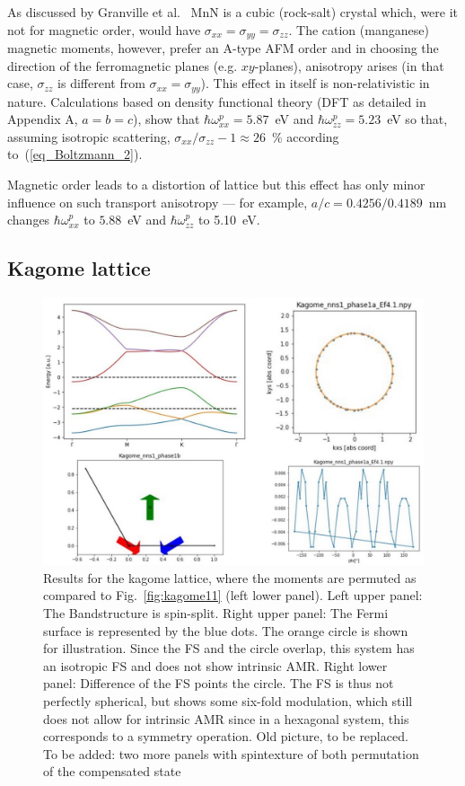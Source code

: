 \documentclass[prb,showpacs,amsmath,amssymb,superscriptaddress,twocolumn,floatfix]{revtex4-1}
\begin{document}
As discussed by Granville et al.~\cite{g} %
MnN is a cubic
(rock-salt) crystal which, were it not for magnetic order, would have
$\sigma_{xx}=\sigma_{yy}=\sigma_{zz}$. The cation (manganese)
magnetic moments, however, prefer an A-type AFM order and in choosing
the direction of the ferromagnetic planes (e.g. $xy$-planes),
anisotropy arises (in that case, $\sigma_{zz}$ is different from
$\sigma_{xx}=\sigma_{yy}$). This effect in itself is non-relativistic in nature.
Calculations based on density functional theory (DFT as 
detailed in Appendix A, $a=b=c$), show that
$\hbar\omega^p_{xx}=5.87$~eV and $\hbar\omega^p_{zz}=5.23$~eV so that,
assuming isotropic scattering, $\sigma_{xx}/\sigma_{zz}-1\approx 26$~\%
according to~(\ref{eq_Boltzmann_2}).

Magnetic order leads to a distortion of lattice but this effect has only
minor influence on such transport anisotropy --- for example,
$a/c=0.4256/0.4189$~nm changes $\hbar\omega^p_{xx}$ to $5.88$~eV and
$\hbar\omega^p_{zz}$ to 5.10~eV.


\subsection{Kagome lattice}

\begin{figure}
	\centering
	\includegraphics[width=0.7\linewidth]{img_total/total_Kagome_phase1a}
	\caption{Results for the kagome lattice, where the moments are permuted as compared to Fig.~\ref{fig:kagome11} (left lower panel). Left upper panel: The Bandstructure is spin-split. Right upper panel: The Fermi surface is represented by the blue dots. The orange circle is shown for illustration. Since the FS and the circle overlap, this system has an isotropic FS and does not show intrinsic AMR. Right lower panel: Difference of the FS points the circle. The FS is thus not perfectly spherical, but shows some six-fold modulation, which still does not allow for intrinsic AMR since in a hexagonal system, this corresponds to a symmetry operation. {\color{red} Old picture, to be replaced. To be added: two more panels with spintexture of both permutation of the compensated state} }
	\label{fig:totalkagomephase1a}
\end{figure}
\end{document}

